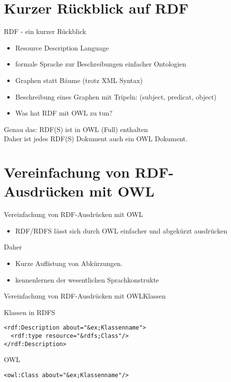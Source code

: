 \documentclass{beamer}
\begin{document}
\section{Kurzer Rückblick auf RDF}
\begin{frame}{RDF - ein kurzer Rückblick}
\begin{itemize}
	\item \alert{R}esource \alert{D}escription \alert{L}anguage
	\item formale Sprache zur Beschreibungen einfacher Ontologien
	\item Graphen statt Bäume (trotz XML Syntax)
	\item Beschreibung eines Graphen mit Tripeln: (subject, predicat, object)
	\item Was hat RDF mit OWL zu tun?
\end{itemize}
\begin{block}{Genau das:}
	RDF(S) ist in OWL (Full) enthalten\\
	Daher ist jedes RDF(S) Dokument auch ein OWL Dokument.
\end{block}
\end{frame}


\section{Vereinfachung von RDF-Ausdrücken mit OWL}
\begin{frame}[fragile]{Vereinfachung von RDF-Ausdrücken mit
OWL}
\begin{itemize}
\item RDF/RDFS lässt sich durch OWL einfacher und abgekürzt ausdrücken
\end{itemize}

\begin{block}{Daher}
\begin{itemize}
\item Kurze Auflistung von Abkürzungen.
\item kennenlernen der wesentlichen Sprachkonstrukte
\end{itemize}
\end{block}


\end{frame}
\begin{frame}[fragile]{Vereinfachung von RDF-Ausdrücken mit
OWL}{Klassen}
\begin{block}{Klassen in RDFS}
\begin{lstlisting}[lang="xml"]
<rdf:Description about="&ex;Klassenname">
  <rdf:type resource="&rdfs;Class"/>
</rdf:Description>
\end{lstlisting}
\end{block}
\begin{block}{OWL}
\begin{lstlisting}[lang="xml"]
<owl:Class about="&ex;Klassenname"/>
\end{lstlisting}
\end{block}

\end{frame}
\end{document}

